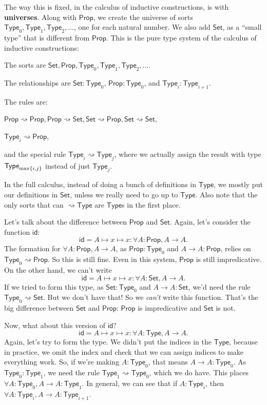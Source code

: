 \documentclass[11pt,paper=letter]{scrartcl}
\renewcommand{\sf}{\mathsf}
\newcommand{\set}{\mathsf{Set}}
\newcommand{\prop}{\mathsf{Prop}}
\newcommand{\type}{\mathsf{Type}}
\newcommand{\toto}{\rightsquigarrow}
\begin{document}
The way this is fixed, in the calculus of inductive constructions, is with \textbf{universes}. Along with $\prop$, we create the universe of sorts $\type_0, \type_1, \type_2, \ldots$, one for each natural number. We also add $\set$, as a ``small type'' that is different from $\prop$. This is the pure type system of the calculus of inductive constructions:

\begin{itemthin}
\item The sorts are $\set, \prop, \type_0, \type_1, \type_2, \ldots$.

\item The relationships are $\set : \type_0$, $\prop : \type_0$, and $\type_i : \type_{i+1}$.

\item The rules are:
\vspace{-0.5em}
\begin{itemthin}
\item $\prop \toto \prop, \prop \toto \set, \set \toto \prop, \set \toto \set$,
\item $\type_i \toto \prop$,
\item and the special rule $\type_i \toto \type_j$, where we actually assign the result with type $\type_{\max\cbr{i, j}}$ instead of just $\type_j$.
\end{itemthin}
\end{itemthin}

In the full calculus, instead of doing a bunch of definitions in $\type$, we mostly put our definitions in $\set$, unless we really need to go up to $\type$. Also note that the only sorts that can $\toto \type$ are $\type$s in the first place.

Let's talk about the difference between $\prop$ and $\set$. Again, let's consider the function $\sf{id}$:
\[
  \sf{id} = A \mapsto x \mapsto x : \forall A: \prop, A \to A.
\]
The formation for $\forall A: \prop, A \to A$, as $\prop : \type_0$ and $A \to A : \prop$, relies on $\type_0 \toto \prop$. So this is still fine. Even in this system, $\prop$ is still impredicative. On the other hand, we can't write \[
  \sf{id} = A \mapsto x \mapsto x : \forall A: \set, A \to A.
\]
If we tried to form this type, as $\set : \type_0$ and $A \to A : \set$, we'd need the rule $\type_0 \toto \set$. But we don't have that! So we \emph{can't} write this function. That's the big difference between $\set$ and $\prop$: $\prop$ is impredicative and $\set$ is not.

Now, what about this version of $\sf{id}$? \[
  \sf{id} = A \mapsto x \mapsto x : \forall A: \type, A \to A.
\]
Again, let's try to form the type. We didn't put the indices in the $\type$, because in practice, we omit the index and check that we can assign indices to make everything work. So, if we're making $A: \type_0$, that means $A \to A: \type_0$. As $\type_0 : \type_1$, we need the rule $\type_1 \toto \type_0$, which we do have. This places $\forall A: \type_0, A \to A : \type_1$. In general, we can see that if $A: \type_i$, then $\forall A: \type_i, A \to A : \type_{i+1}$.
\end{document}
